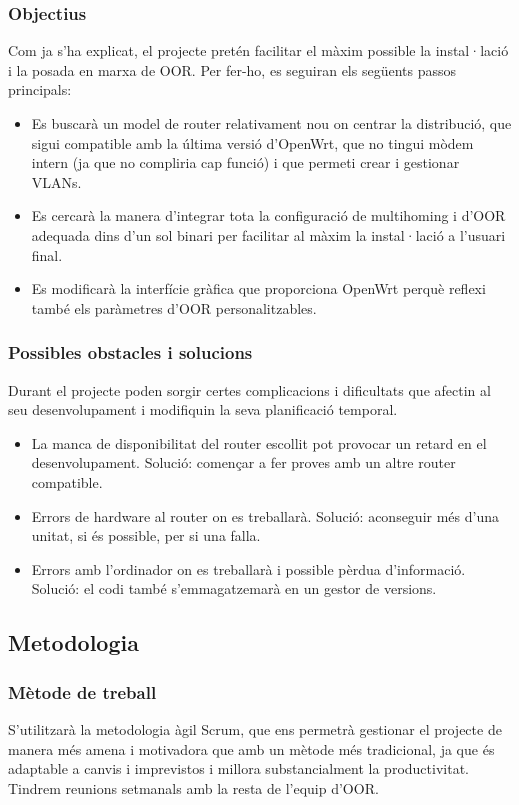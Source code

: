 \documentclass[11pt]{article}
\begin{document}
\subsubsection{Objectius}
Com ja s’ha explicat, el projecte pretén facilitar el màxim possible la instal·lació i la posada en marxa de OOR. Per fer-ho, es seguiran els següents passos principals:
\begin{itemize}
\item Es buscarà un model de router relativament nou on centrar la distribució, que sigui compatible amb la última versió d’OpenWrt, que no tingui mòdem intern (ja que no compliria cap funció) i que permeti crear i gestionar VLANs.
\item Es cercarà la manera d’integrar tota la configuració de multihoming i d’OOR adequada dins d’un sol binari per facilitar al màxim la instal·lació a l’usuari final.
\item Es modificarà la interfície gràfica que proporciona OpenWrt perquè reflexi també els paràmetres d’OOR personalitzables.
\end{itemize}
\subsubsection{Possibles obstacles i solucions}
Durant el projecte poden sorgir certes complicacions i dificultats que afectin al seu desenvolupament i modifiquin la seva planificació temporal.
\begin{itemize}
\item La manca de disponibilitat del router escollit pot provocar un retard en el  desenvolupament. Solució: començar a fer proves amb un altre router compatible.
\item Errors de hardware al router on es treballarà. Solució: aconseguir més d’una unitat, si és possible, per si una falla.
\item Errors amb l’ordinador on es treballarà i possible pèrdua d’informació. Solució: el codi també s’emmagatzemarà en un gestor de versions.
\end{itemize}
\subsection{Metodologia}
\subsubsection{Mètode de treball}
S’utilitzarà la metodologia àgil Scrum, que ens permetrà gestionar el projecte de manera més amena i motivadora que amb un mètode més tradicional, ja que és adaptable a canvis i imprevistos i millora substancialment la productivitat. Tindrem reunions setmanals amb la resta de l’equip d’OOR.
\end{document}
